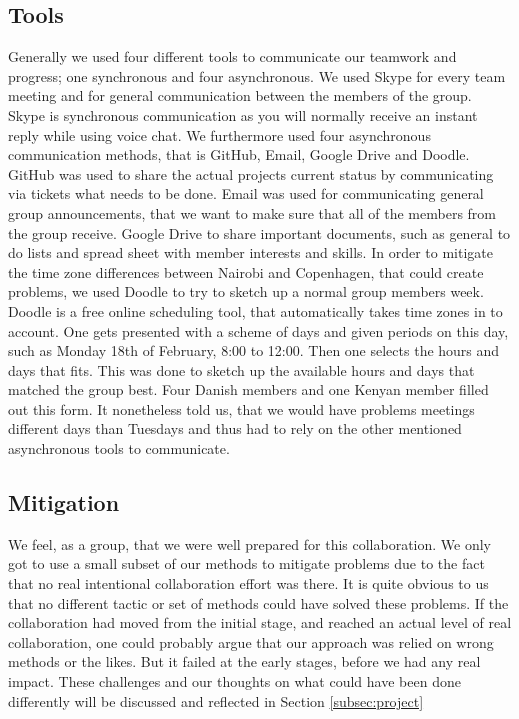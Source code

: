 \subsection{Tools} \label{sec:tools}
Generally we used four different tools to communicate our teamwork and progress; one synchronous and four asynchronous. We used Skype for every team meeting and for general communication between the members of the group. Skype is synchronous communication as you will normally receive an instant reply while using voice chat. We furthermore used four asynchronous communication methods, that is GitHub, Email, Google Drive and Doodle. GitHub was used to share the actual projects current status by communicating via tickets what needs to be done. Email was used for communicating general group announcements, that we want to make sure that all of the members from the group receive. Google Drive to share important documents, such as general to do lists and spread sheet with member interests and skills. In order to mitigate the time zone differences between Nairobi and Copenhagen, that could create problems, we used Doodle to try to sketch up a normal group members week. Doodle is a free online scheduling tool, that automatically takes time zones in to account. One gets presented with a scheme of days and given periods on this day, such as Monday 18th of February, 8:00 to 12:00. Then one selects the hours and days that fits. This was done to sketch up the available hours and days that matched the group best. Four Danish members and one Kenyan member filled out this form. It nonetheless told us, that we would have problems meetings different days than Tuesdays and thus had to rely on the other mentioned asynchronous tools to communicate.

\subsection{Mitigation} \label{sec:mitigation}
We feel, as a group, that we were well prepared for this collaboration. We only got to use a small subset of our methods to mitigate problems due to the fact that no real intentional collaboration effort was there. It is quite obvious to us that no different tactic or set of methods could have solved these problems. If the collaboration had moved from the initial stage, and reached an actual level of real collaboration, one could probably argue that our approach was relied on wrong methods or the likes. But it failed at the early stages, before we had any real impact. These challenges and our thoughts on what could have been done differently will be discussed and reflected in Section \ref{subsec:project}


